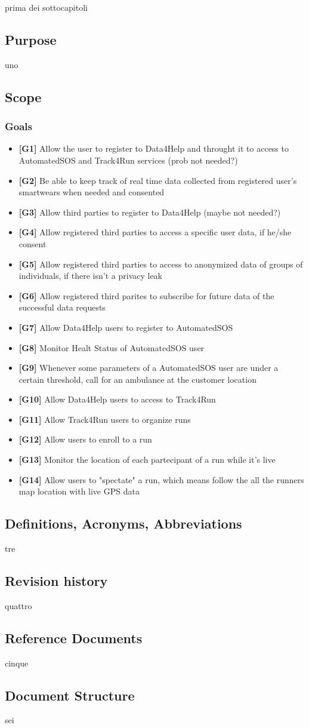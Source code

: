 prima dei sottocapitoli
\subsection{Purpose}
uno
\subsection{Scope}
\subsubsection{Goals}
\begin{itemize}
\item \textbf{[G1]} Allow the user to register to Data4Help and throught it to access to AutomatedSOS and Track4Run services (prob not needed?)
\item \textbf{[G2]} Be able to keep track of real time data collected from registered user's smartwears when needed and consented
\item \textbf{[G3]} Allow third parties to register to Data4Help (maybe not needed?)
\item \textbf{[G4]} Allow registered third parties to access a specific user data, if he/she consent
\item \textbf{[G5]} Allow registered third parties to access to anonymized data of groups of individuals, if there isn't a privacy leak
\item \textbf{[G6]} Allow registered third parites to subscribe for future data of the successful data requests
\item \textbf{[G7]} Allow Data4Help users to register to AutomatedSOS
\item \textbf{[G8]} Monitor Healt Status of AutomatedSOS user
\item \textbf{[G9]} Whenever some parameters of a AutomatedSOS user are under a certain threshold, call for an ambulance at the customer location
\item \textbf{[G10]} Allow Data4Help users to access to Track4Run
\item \textbf{[G11]} Allow Track4Run users to organize runs
\item \textbf{[G12]} Allow users to enroll to a run
\item \textbf{[G13]} Monitor the location of each partecipant of a run while it's live
\item \textbf{[G14]} Allow users to "spectate" a run, which means follow the all the runners map location with live GPS data
 
\end{itemize}
\subsection{Definitions, Acronyms, Abbreviations}
tre
\subsection{Revision history}
quattro
\subsection{Reference Documents}
cinque
\subsection{Document Structure}
sei
